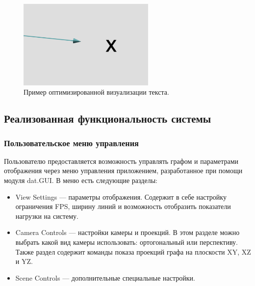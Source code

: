 \begin{figure}[!ht]
    \centering
    \includegraphics[width=0.6\textwidth]{assets/optimization_2.png}
    \caption{Пример оптимизированной визуализации текста.}
    \label{fig:opt_2}
\end{figure}








\subsection{Реализованная функциональность системы}
\subsubsection{Пользовательское меню управления}

Пользователю предоставляется возможность управлять графом и параметрами отображения через меню управления приложением, разработанное при помощи модуля dat.GUI. В меню есть следующие разделы:

\begin{itemize}
    \item View Settings — параметры отображения. Содержит в себе настройку ограничения FPS, ширину линий и возможность отобразить показатели нагрузки на систему.
    \item Camera Controls — настройки камеры и проекций. В этом разделе можно выбрать какой вид камеры использовать: ортогональный или перспективу. Также раздел содержит команды показа проекций графа на плоскости XY, XZ и YZ.
    \item Scene Controls — дополнительные специальные настройки.
\end{itemize}


